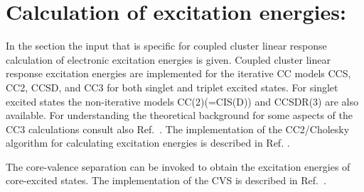 
\section{Calculation of excitation energies: }\label{sec:ccexci}

In the  section the input that is
specific for coupled cluster linear response calculation of
electronic excitation energies is given. 
Coupled cluster linear response excitation energies 
are implemented for the iterative CC models CCS, CC2, CCSD, and CC3 for 
both singlet and triplet excited states.
For singlet excited states the non-iterative models CC(2)(=CIS(D)) and CCSDR(3)
are also available.
For understanding the theoretical background for some
aspects of the CC3 calculations consult also Ref.\ \cite{Christiansen:JCP105,Hald:JCP113,Christiansen:JCP103,Hald:JCP115}.
The implementation of the CC2/Cholesky algorithm for calculating excitation
energies is described in Ref. \cite{choexci}.

The core-valence separation can be invoked to obtain the excitation energies of core-excited states.
The implementation of the CVS is described in Ref.~\cite{Coriani:CVS}.

\begin{center}
\end{center}




